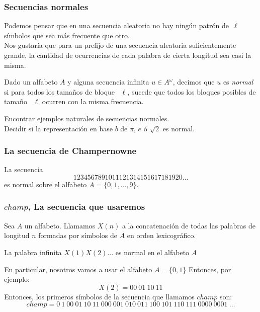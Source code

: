 \documentclass[10pt,mathserif]{beamer}%
\begin{document}
\begin{frame}
\frametitle{Secuencias normales}
Podemos pensar que en una secuencia aleatoria no hay ningún patrón de~$\ell$ símbolos que sea más frecuente que otro.\\
\pause
Nos gustaría que para un prefijo de una secuencia aleatoria suficientemente grande, 
la cantidad de ocurrencias de cada palabra de cierta longitud sea casi la misma.

\begin{definition}
  Dado un alfabeto $A$ y alguna secuencia infinita $u \in A^{\omega}$, 
  decimos que $u$ es \textit{normal} si para todos los tamaños de bloque ~$\ell$,
  sucede que todos los bloques posibles de tamaño ~$\ell$ ocurren con la misma frecuencia.
   \end{definition}
   \pause
   \begin{problem}
    Encontrar ejemplos naturales de secuencias normales. \\
    Decidir si la representación en base $b$ de $\pi$, $e$ ó $\sqrt{2}$ es normal.
    \end{problem}
\end{frame}



\begin{frame}
\frametitle{La secuencia de Champernowne}
  \begin{theorem}
  La secuencia
  $$1234567891011121314151617181920\ldots$$
  es normal 
  sobre 
  el alfabeto $A = \{0, 1, \ldots, 9\}$.
  \end{theorem}
\end{frame}

\begin{frame}
\frametitle{$champ$, La secuencia que usaremos}
  

  \begin{theorem}
    Sea $A$ un alfabeto. Llamamos  $X(n)$ a la concatenación de todas las palabras de longitud $n$ formadas por símbolos de $A$ en orden lexicográfico.
    
    La palabra infinita $X(1)X(2)\dots$ es normal en el alfabeto $A$
  \end{theorem}

  \medskip
  \pause
  En particular, nosotros vamos a usar el alfabeto  $A=\{0,1\}$ Entonces, por ejemplo:
  $$X(2) = 00 \: 01 \: 10 \: 11$$
  \medskip
  \pause
  Entonces, los primeros símbolos de la secuencia que llamamos $champ$ son:
  $$champ = 0 \: 1 \: 00 \: 01 \: 10 \: 11 \: 000 \: 001 \: 010 \: 011 \: 100 \: 101 \: 110 \: 111 \: 0000 \: 0001 \: \dots$$


\end{frame}
\end{document}
